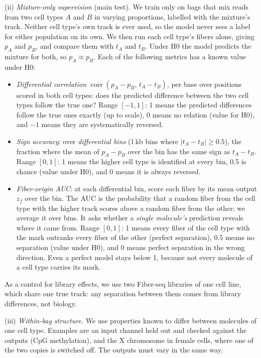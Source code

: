 \documentclass[acmtog,nonacm]{acmart}   %
\begin{document}
(ii) \emph{Mixture-only supervision} (main test). We train only on bags that mix reads
from two cell types $A$ and $B$ in varying proportions, labelled with the mixture's track.
Neither cell type's own track is ever used, so the model never sees a label for either
population on its own. We then run each cell type's fibers alone, giving $p_A$ and $p_B$,
and compare them with $t_A$ and $t_B$. Under H0 the model predicts the mixture for both,
so $p_A\approx p_B$. Each of the following metrics has a known value under H0:
\begin{itemize}
  \item \emph{Differential correlation} $\operatorname{corr}(p_A-p_B,\,t_A-t_B)$,
    per base over positions scored in both cell types: does the predicted difference
    between the two cell types follow the true one? Range $[-1,1]$: 1 means the predicted
    differences follow the true ones exactly (up to scale), 0 means no relation (value
    for H0), and $-1$ means they are systematically reversed.

  \item \emph{Sign accuracy}: over \emph{differential bins} (1\,kb bins where $|t_A-t_B|\ge0.5$),
    the fraction where the mean of $p_A-p_B$ over the bin has the same sign as $t_A-t_B$.
    Range $[0,1]$: 1 means the higher cell type is identified at every bin, 0.5 is chance
    (value under H0), and 0 means it is always reversed.

  \item \emph{Fiber-origin AUC}: at each differential bin, score each fiber by its mean
  output $z_f$ over the bin. The AUC is the probability that a random fiber from the cell
  type with the higher track scores above a random fiber from the other; we average it
  over bins. It asks whether a \emph{single molecule's} prediction reveals where it came
  from. Range $[0,1]$: 1 means every fiber of the cell type with the mark outranks every
  fiber of the other (perfect separation), 0.5 means no separation (value under H0), and
  0 means perfect separation in the wrong direction. Even a perfect model stays below 1,
  because not every molecule of a cell type carries its mark.
\end{itemize}
As a control for library effects, we use two Fiber-seq libraries of one cell line, which
share one true track: any separation between them comes from library differences, not biology.

(iii) \emph{Within-bag structure.} We use properties known to differ between molecules
of one cell type. Examples are an input channel held out and checked against the outputs
(CpG methylation), and the X chromosome in female cells, where one of the two copies is
switched off. The outputs must vary in the same way.
\end{document}
